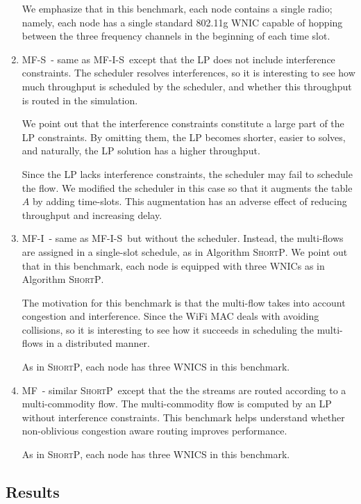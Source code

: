 \documentclass[12pt]{article}
\newenvironment{proof sketch}[1]{\noindent {\emph{Proof sketch of #1:}}}{\hfill \qed}
\newcommand{\algA}{\textsc{MF-I-S}}
\newcommand{\algB}{\textsc{ShortP}}
\newcommand{\algC}{\textsc{MF-I}}
\newcommand{\algD}{\textsc{MF}}
\newcommand{\algE}{\textsc{MF-S}}
\newcommand{\algS}{\algB}
\begin{document}
\begin{enumerate}
  We emphasize that in this benchmark, each node contains a single
  radio; namely, each node has a single standard 802.11g WNIC capable
  of hopping between the three frequency channels in the beginning of
  each time slot.

\item \algE\ - same as \algA\ except that the LP does not include
  interference constraints. The scheduler resolves interferences, so
  it is interesting to see how much throughput is scheduled by the
  scheduler, and whether this throughput is routed in the simulation.

  We point out that the interference constraints constitute a large
  part of the LP constraints. By omitting them, the LP becomes
  shorter, easier to solves, and naturally, the LP solution has a
  higher throughput.


  Since the LP lacks interference constraints, the scheduler may fail
  to schedule the flow. We modified the scheduler in this case so that
  it augments the table $A$ by adding time-slots. This augmentation
  has an adverse effect of reducing throughput and increasing delay.


\item \algC\ - same as \algA\ but without the scheduler.  Instead, the
  multi-flows are assigned in a single-slot schedule, as in Algorithm
  \algS. We point out that in this benchmark, each node is equipped
  with three WNICs as in Algorithm \algS.

  The motivation for this benchmark is that the multi-flow takes into
  account congestion and interference. Since the WiFi MAC deals with
  avoiding collisions, so it is interesting to see how it succeeds in
  scheduling the multi-flows in a distributed manner.

As in \algS, each node has three WNICS in this benchmark.

\item \algD\ - similar \algS\ except that the the streams are routed
  according to a multi-commodity flow. The multi-commodity flow is
  computed by an LP without interference constraints.  This benchmark
  helps understand whether non-oblivious congestion aware routing
  improves performance.

As in \algS, each node has three WNICS in this benchmark.
\end{enumerate}

\subsection{Results}
\end{document}
